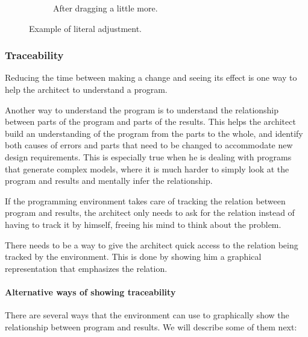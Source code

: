 \begin{figure}
\begin{subfigure}[b]{0.3\linewidth}
    \caption{After dragging a little more.}
  \end{subfigure}
  \caption{Example of literal adjustment.}
  \label{fig:lit:adjust}
\end{figure}


\subsubsection{Traceability}
\label{sec:traceability}
Reducing the time between making a change and seeing its effect is one way to help the architect to understand a program.

Another way to understand the program is to understand the relationship between parts of the program and parts of the results.
This helps the architect build an understanding of the program from the parts to the whole, and identify both causes of errors and parts that need to be changed to accommodate new design requirements.
This is especially true when he is dealing with programs that generate complex models, where it is much harder to simply look at the program and results and mentally infer the relationship.

If the programming environment takes care of tracking the relation between program and results, the architect only needs to ask for the relation instead of having to track it by himself, freeing his mind to think about the problem.

There needs to be a way to give the architect quick access to the relation being tracked by the environment.
This is done by showing him a graphical representation that emphasizes the relation.

\paragraph{Alternative ways of showing traceability}
There are several ways that the environment can use to graphically show the relationship between program and results.
We will describe some of them next:

